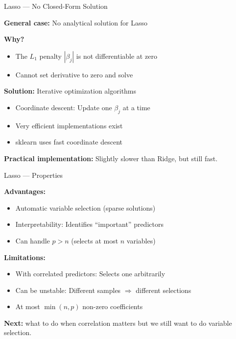 \documentclass[10pt]{beamer}
\begin{document}
\begin{frame}{Lasso --- No Closed-Form Solution}

\textbf{General case:} No analytical solution for Lasso

\vspace{1em}
\textbf{Why?}
\begin{itemize}
  \item The $L_1$ penalty $|\beta_j|$ is not differentiable at zero
  \item Cannot set derivative to zero and solve
\end{itemize}

\vspace{1em}
\textbf{Solution:} Iterative optimization algorithms
\begin{itemize}
  \item Coordinate descent: Update one $\beta_j$ at a time
  \item Very efficient implementations exist
  \item sklearn uses fast coordinate descent
\end{itemize}

\vspace{1em}
\textbf{Practical implementation:} Slightly slower than Ridge, but still fast.

\end{frame}


\begin{frame}{Lasso --- Properties}

\textbf{Advantages:}
\begin{itemize}
  \item Automatic variable selection (sparse solutions)
  \item Interpretability: Identifies ``important'' predictors
  \item Can handle $p > n$ (selects at most $n$ variables)
\end{itemize}

\vspace{1em}
\textbf{Limitations:}
\begin{itemize}
  \item With correlated predictors: Selects one arbitrarily
  \item Can be unstable: Different samples $\Rightarrow$ different selections
  \item At most $\min(n, p)$ non-zero coefficients
\end{itemize}

\vspace{1em}
\textbf{Next:} what to do when correlation matters but we still want to do variable selection.

\end{frame}
\end{document}
